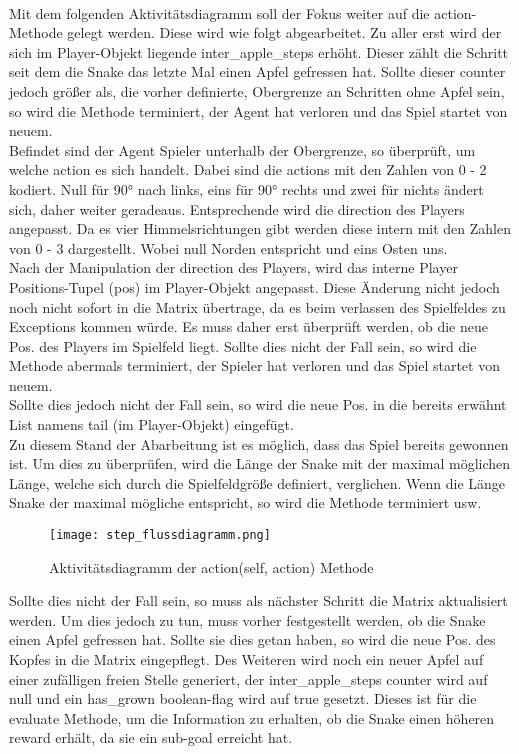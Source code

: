 \\Mit dem folgenden Aktivitätsdiagramm soll der Fokus weiter auf die action-Methode gelegt werden. Diese wird wie folgt abgearbeitet.
Zu aller erst wird der sich im Player-Objekt liegende inter\_apple\_steps erhöht. Dieser zählt die Schritt seit dem die Snake das letzte Mal einen Apfel gefressen hat. Sollte dieser counter jedoch größer als, die vorher definierte, Obergrenze an Schritten ohne Apfel sein, so wird die Methode terminiert, der Agent hat verloren und das Spiel startet von neuem.\\
Befindet sind der Agent Spieler unterhalb der Obergrenze, so überprüft, um welche action es sich handelt. Dabei sind die actions mit den Zahlen von 0 - 2 kodiert. Null für 90° nach links, eins für 90° rechts und zwei für nichts ändert sich, daher weiter geradeaus. Entsprechende wird die direction des Players angepasst. Da es vier Himmelsrichtungen gibt werden diese intern mit den Zahlen von 0 - 3 dargestellt. Wobei null Norden entspricht und eins Osten uns.\\
Nach der Manipulation der direction des Players, wird das interne Player Positions-Tupel (pos) im Player-Objekt angepasst. Diese Änderung nicht jedoch noch nicht sofort in die Matrix übertrage, da es beim verlassen des Spielfeldes zu Exceptions kommen würde. Es muss daher erst überprüft werden, ob die neue Pos. des Players im Spielfeld liegt. Sollte dies nicht der Fall sein, so wird die Methode abermals terminiert, der Spieler hat verloren und das Spiel startet von neuem.\\
Sollte dies jedoch nicht der Fall sein, so wird die neue Pos. in die bereits erwähnt List namens tail (im Player-Objekt) eingefügt.\\
Zu diesem Stand der Abarbeitung ist es möglich, dass das Spiel bereits gewonnen ist. Um dies zu überprüfen, wird die Länge der Snake mit der maximal möglichen Länge, welche sich durch die Spielfeldgröße definiert, verglichen. Wenn die Länge Snake der maximal mögliche entspricht, so wird die Methode terminiert usw.
\begin{figure}[H]
	\begin{center}
		\texttt{[image: step\_flussdiagramm.png]}
		\caption[Step-Methode]{Aktivitätsdiagramm der action(self, action) Methode}
		\label{fig:action_activity_diagram}
	\end{center}
\end{figure}
Sollte dies nicht der Fall sein, so muss als nächster Schritt die Matrix aktualisiert werden. Um dies jedoch zu tun, muss vorher festgestellt werden, ob die Snake einen Apfel gefressen hat. Sollte sie dies getan haben, so wird die neue Pos. des Kopfes in die Matrix eingepflegt. Des Weiteren wird noch ein neuer Apfel auf einer zufälligen freien Stelle generiert, der inter\_apple\_steps counter wird auf null und ein has\_grown boolean-flag wird auf true gesetzt. Dieses ist für die evaluate Methode, um die Information zu erhalten, ob die Snake einen höheren reward erhält, da sie ein sub-goal erreicht hat.\\
